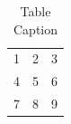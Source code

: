 \documentclass[final,5p,times,twocolumn]{elsarticle}
\begin{document}
\begin{table}[t]%
\centering%
\begin{tabular}{l c r}%
  1 & 2 & 3 \\ %
  4 & 5 & 6 \\
  7 & 8 & 9 \\
\end{tabular}
\caption{Table Caption}\label{fig1}
\end{table}

 

\end{document}
